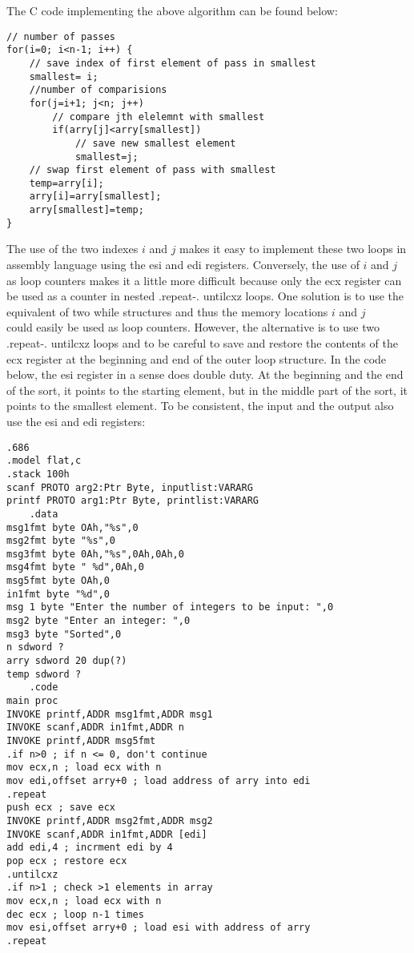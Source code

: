 \documentclass[10pt]{article}
\begin{document}
The C code implementing the above algorithm can be found below:

\begin{verbatim}
// number of passes
for(i=0; i<n-1; i++) {
    // save index of first element of pass in smallest
    smallest= i;
    //number of comparisions
    for(j=i+1; j<n; j++)
        // compare jth elelemnt with smallest
        if(arry[j]<arry[smallest])
            // save new smallest element
            smallest=j;
    // swap first element of pass with smallest
    temp=arry[i];
    arry[i]=arry[smallest];
    arry[smallest]=temp;
}
\end{verbatim}

The use of the two indexes $i$ and $j$ makes it easy to implement these two loops in assembly language using the esi and edi registers. Conversely, the use of $i$ and $j$ as loop counters makes it a little more difficult because only the ecx register can be used as a counter in nested .repeat-. untilcxz loops. One solution is to use the equivalent of two while structures and thus the memory locations $i$ and $j$\\
could easily be used as loop counters. However, the alternative is to use two .repeat-. untilcxz loops and to be careful to save and restore the contents of the ecx register at the beginning and end of the outer loop structure. In the code below, the esi register in a sense does double duty. At the beginning and the end of the sort, it points to the starting element, but in the middle part of the sort, it points to the smallest element. To be consistent, the input and the output also use the esi and edi registers:

\begin{verbatim}
.686
.model flat,c
.stack 100h
scanf PROTO arg2:Ptr Byte, inputlist:VARARG
printf PROTO arg1:Ptr Byte, printlist:VARARG
    .data
msg1fmt byte OAh,"%s",0
msg2fmt byte "%s",0
msg3fmt byte 0Ah,"%s",0Ah,0Ah,0
msg4fmt byte " %d",0Ah,0
msg5fmt byte OAh,0
in1fmt byte "%d",0
msg 1 byte "Enter the number of integers to be input: ",0
msg2 byte "Enter an integer: ",0
msg3 byte "Sorted",0
n sdword ?
arry sdword 20 dup(?)
temp sdword ?
    .code
main proc
INVOKE printf,ADDR msg1fmt,ADDR msg1
INVOKE scanf,ADDR in1fmt,ADDR n
INVOKE printf,ADDR msg5fmt
.if n>0 ; if n <= 0, don't continue
mov ecx,n ; load ecx with n
mov edi,offset arry+0 ; load address of arry into edi
.repeat
push ecx ; save ecx
INVOKE printf,ADDR msg2fmt,ADDR msg2
INVOKE scanf,ADDR in1fmt,ADDR [edi]
add edi,4 ; incrment edi by 4
pop ecx ; restore ecx
.untilcxz
.if n>1 ; check >1 elements in array
mov ecx,n ; load ecx with n
dec ecx ; loop n-1 times
mov esi,offset arry+0 ; load esi with address of arry
.repeat
\end{verbatim}
\end{document}
